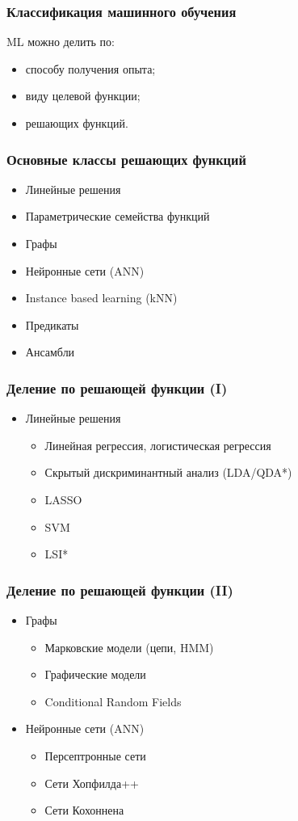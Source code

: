 \documentclass[14pt, fleqn, xcolor={dvipsnames, table}]{beamer}
\begin{document}
\begin{frame}
\frametitle{Классификация машинного обучения}
ML можно делить по:
\begin{itemize}
	\item способу получения опыта;
	\item виду целевой функции;
	\item { решающих функций.}
\end{itemize}
\end{frame}

\begin{frame}
\frametitle{Основные классы решающих функций}
\begin{itemize}
\item Линейные решения
\item Параметрические семейства функций
\item Графы
\item Нейронные сети (ANN)
\item Instance based learning (kNN)
\item Предикаты
\item Ансамбли
\end{itemize}
\end{frame}

\begin{frame}
\frametitle{Деление по решающей функции (I)}
\begin{itemize}
\item Линейные решения 
	\begin{itemize}
	\item Линейная регрессия, логистическая регрессия
	\item Скрытый дискриминантный анализ (LDA/QDA*)
	\item LASSO
	\item SVM
	\item LSI*
	\end{itemize}
\end{itemize}
\end{frame}

\begin{frame}
\frametitle{Деление по решающей функции (II)}
\begin{itemize}
\item Графы
\begin{itemize}
	\item Марковские модели (цепи, HMM)
	\item Графические модели
	\item Conditional Random Fields
\end{itemize}
\item Нейронные сети (ANN)
\begin{itemize}
	\item Персептронные сети
	\item Сети Хопфилда++
	\item Сети Кохоннена
\end{itemize}
\end{itemize}
\end{frame}
\end{document}
